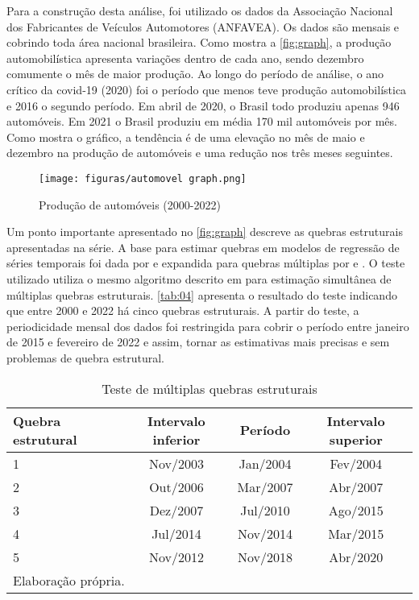 \documentclass[
article, %
12pt, %
oneside, %
a4paper, %
portuguese, %
portuguese %
]{abntex2}
\begin{document}
Para a construção desta análise, foi utilizado os dados da Associação Nacional dos Fabricantes de Veículos Automotores (ANFAVEA). Os dados são mensais e cobrindo toda área nacional brasileira. Como mostra a \autoref{fig:graph}, a produção automobilística apresenta variações dentro de cada ano, sendo dezembro comumente o mês de maior produção. Ao longo do período de análise, o ano crítico da covid-19 (2020) foi o período que menos teve produção automobilística e 2016 o segundo período. Em abril de 2020, o Brasil todo produziu apenas 946 automóveis. Em 2021 o Brasil produziu em média 170 mil automóveis por mês. Como mostra o gráfico, a tendência é de uma elevação no mês de maio e dezembro na produção de automóveis e uma redução nos três meses seguintes.

\begin{figure}[H]
    \centering
    \texttt{[image: figuras/automovel graph.png]}
    \caption{Produção de automóveis (2000-2022)}
    \label{fig:graph}
\end{figure}

Um ponto importante apresentado no \autoref{fig:graph} descreve as quebras estruturais apresentadas na série. A base para estimar quebras em modelos de regressão de séries temporais foi dada por  e expandida para quebras múltiplas por  e . O teste utilizado utiliza o mesmo algoritmo descrito em  para estimação simultânea de múltiplas quebras estruturais. \autoref{tab:04} apresenta o resultado do teste indicando que entre 2000 e 2022 há cinco quebras estruturais. A partir do teste, a periodicidade mensal dos dados foi restringida para cobrir o período entre janeiro de 2015 e fevereiro de 2022 e assim, tornar as estimativas mais precisas e sem problemas de quebra estrutural.

\begin{table}[H] 
  \centering
  \caption{Teste de múltiplas quebras estruturais}
    \begin{tabular}{l|ccc}
    \hline
    Quebra estrutural &  Intervalo inferior & Período & Intervalo superior \\
    \hline
    1 & Nov/2003  & Jan/2004  & Fev/2004 \\
    2 & Out/2006  & Mar/2007  & Abr/2007  \\
    3 & Dez/2007  & Jul/2010  & Ago/2015  \\
    4 & Jul/2014  & Nov/2014  & Mar/2015  \\
    5 & Nov/2012  & Nov/2018  & Abr/2020  \\
    \hline
    \multicolumn{4}{l}{Elaboração própria.}
    \end{tabular}%
  \label{tab:04}%
\end{table}%
\end{document}
